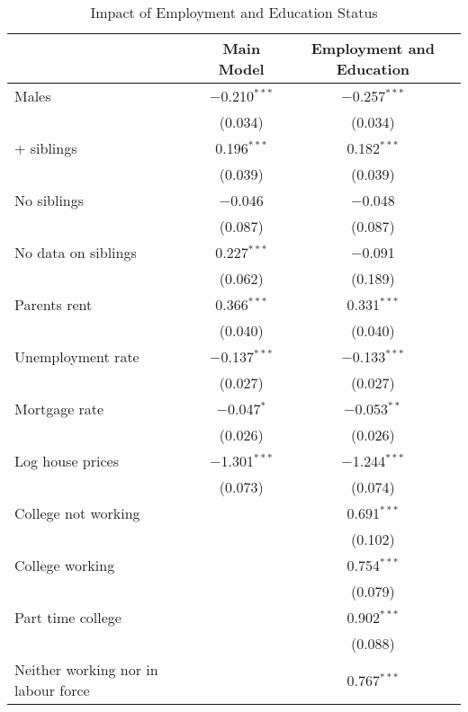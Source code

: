 
\begin{table}[!htbp] \centering 
  \begin{threeparttable}
  \caption{Impact of Employment and Education Status} 
  \label{empEdu} 
\begin{tabular}{@{\extracolsep{1pt}}lcc} 
\toprule
\parbox[t]{0.24\textwidth}{\centering } & \parbox[t]{0.18\textwidth}{\centering Main Model} & \parbox[t]{0.18\textwidth}{\centering Employment and Education} \\
\midrule
 Males & $-$0.210$^{***}$ & $-$0.257$^{***}$ \\ 
  & (0.034) & (0.034) \\ 
+ siblings & 0.196$^{***}$ & 0.182$^{***}$ \\ 
  & (0.039) & (0.039) \\ 
\addlinespace[0.5em]
 No siblings & $-$0.046 & $-$0.048 \\ 
  & (0.087) & (0.087) \\ 
\addlinespace[0.5em]
 No data on siblings & 0.227$^{***}$ & $-$0.091 \\ 
  & (0.062) & (0.189) \\ 
\addlinespace[0.5em]
 Parents rent & 0.366$^{***}$ & 0.331$^{***}$ \\ 
  & (0.040) & (0.040) \\ 
\addlinespace[0.5em]
 Unemployment rate & $-$0.137$^{***}$ & $-$0.133$^{***}$ \\ 
  & (0.027) & (0.027) \\ 
\addlinespace[0.5em]
 Mortgage rate & $-$0.047$^{*}$ & $-$0.053$^{**}$ \\ 
  & (0.026) & (0.026) \\ 
\addlinespace[0.5em]
 Log house prices & $-$1.301$^{***}$ & $-$1.244$^{***}$ \\ 
  & (0.073) & (0.074) \\ 
\addlinespace[0.5em]
 College not working &  & 0.691$^{***}$ \\ 
  &  & (0.102) \\ 
\addlinespace[0.5em]
 College working &  & 0.754$^{***}$ \\ 
  &  & (0.079) \\ 
\addlinespace[0.5em]
 Part time college &  & 0.902$^{***}$ \\ 
  &  & (0.088) \\ 
\addlinespace[0.5em]
 Neither working nor in labour force &  & 0.767$^{***}$ \\ 

\end{tabular}
\end{threeparttable}
\end{table}
